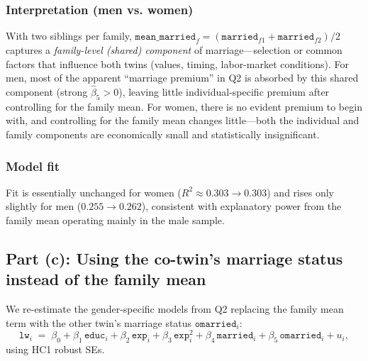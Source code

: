 \documentclass[12pt]{article}
\begin{document}
\subsubsection*{Interpretation (men vs. women)}
With two siblings per family, \(\texttt{mean\_married}_f=(\texttt{married}_{f1}+\texttt{married}_{f2})/2\) captures a \emph{family-level (shared) component} of marriage—selection or common factors that influence both twins (values, timing, labor-market conditions).  
For men, most of the apparent “marriage premium” in Q2 is absorbed by this shared component (strong \(\widehat\beta_5>0\)), leaving little individual-specific premium after controlling for the family mean.  
For women, there is no evident premium to begin with, and controlling for the family mean changes little—both the individual and family components are economically small and statistically insignificant.

\subsubsection*{Model fit}
Fit is essentially unchanged for women (\(R^2 \approx 0.303 \to 0.303\)) and rises only slightly for men (\(0.255 \to 0.262\)), consistent with explanatory power from the family mean operating mainly in the male sample.

\subsection*{Part (c): Using the co-twin's marriage status instead of the family mean}

We re-estimate the gender-specific models from Q2 replacing the family mean term with the
other twin’s marriage status \(\texttt{omarried}_{i}\):
\[
  \texttt{lw}_{i}
  \;=\; \beta_0 + \beta_1\,\texttt{educ}_{i}
  + \beta_2\,\texttt{exp}_{i} + \beta_3\,\texttt{exp}_{i}^{2}
  + \beta_4\,\texttt{married}_{i} + \beta_5\,\texttt{omarried}_{i} + u_{i},
\]
using HC1 robust SEs.
\end{document}
